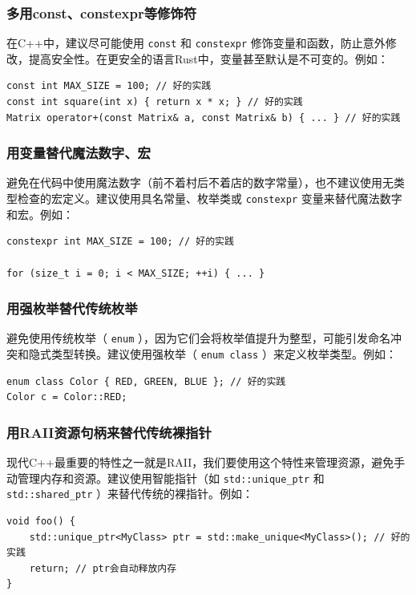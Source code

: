 \subsubsection{多用const、constexpr等修饰符}

在C++中，建议尽可能使用 \texttt{const} 和 \texttt{constexpr} 修饰变量和函数，防止意外修改，提高安全性。在更安全的语言Rust中，变量甚至默认是不可变的。例如：
\begin{verbatim}
const int MAX_SIZE = 100; // 好的实践
const int square(int x) { return x * x; } // 好的实践
Matrix operator+(const Matrix& a, const Matrix& b) { ... } // 好的实践
\end{verbatim}

\subsubsection{用变量替代魔法数字、宏}

避免在代码中使用魔法数字（前不着村后不着店的数字常量），也不建议使用无类型检查的宏定义。建议使用具名常量、枚举类或 \texttt{constexpr} 变量来替代魔法数字和宏。例如：
\begin{verbatim}
constexpr int MAX_SIZE = 100; // 好的实践

for (size_t i = 0; i < MAX_SIZE; ++i) { ... }
\end{verbatim}

\subsubsection{用强枚举替代传统枚举}

避免使用传统枚举（ \texttt{enum} ），因为它们会将枚举值提升为整型，可能引发命名冲突和隐式类型转换。建议使用强枚举（ \texttt{enum class} ）来定义枚举类型。例如：
\begin{verbatim}
enum class Color { RED, GREEN, BLUE }; // 好的实践
Color c = Color::RED;
\end{verbatim}

\subsubsection{用RAII资源句柄来替代传统裸指针}

现代C++最重要的特性之一就是RAII，我们要使用这个特性来管理资源，避免手动管理内存和资源。建议使用智能指针（如 \texttt{std::unique\_ptr} 和 \texttt{std::shared\_ptr} ）来替代传统的裸指针。例如：
\begin{verbatim}
void foo() {
    std::unique_ptr<MyClass> ptr = std::make_unique<MyClass>(); // 好的实践
    return; // ptr会自动释放内存
}
\end{verbatim}

